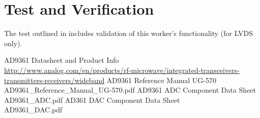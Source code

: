 \documentclass{article}
\begin{document}
\section*{Test and Verification}
The test outlined in \cite{dac_comp_datasheet} includes validation of this worker's functionality (for LVDS only).


  \begin{thebibliography}{1}

 AD9361 Datasheet and Product Info \\
\url{http://www.analog.com/en/products/rf-microwave/integrated-transceivers-transmitters-receivers/wideband}
   AD9361 Reference Manual UG-570\\
  AD9361\_Reference\_Manual\_UG-570.pdf
   AD9361 ADC Component Data Sheet \\AD9361\_ADC.pdf
   AD361 DAC Component Data Sheet \\AD9361\_DAC.pdf

  \end{thebibliography}
\end{document}
